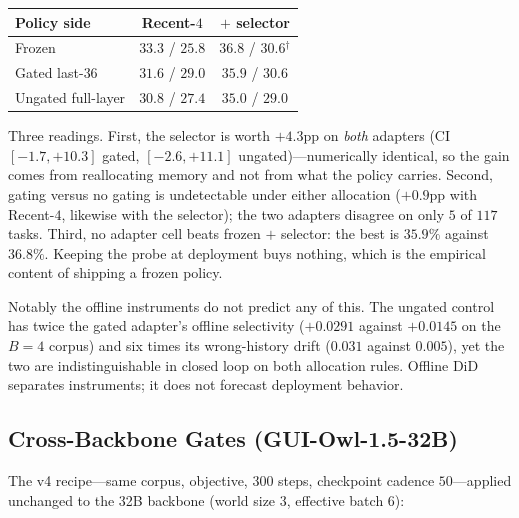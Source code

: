 \documentclass[letterpaper]{article} %
\begin{document}
\begin{center}
{\small
\setlength{\tabcolsep}{4.2pt}
\begin{tabular}{@{}lcc@{}}
\toprule
Policy side & Recent-$4$ & $+$ selector \\
\midrule
Frozen & $33.3$ / $25.8$ & $36.8$ / $30.6$$^{\dagger}$ \\
Gated last-$36$ & $31.6$ / $29.0$ & $35.9$ / $30.6$ \\
Ungated full-layer & $30.8$ / $27.4$ & $35.0$ / $29.0$ \\
\bottomrule
\end{tabular}
}
\label{tab:s-adapter-2x2}
\end{center}

Three readings. First, the selector is worth $+4.3$pp on \emph{both}
adapters (CI $[-1.7,+10.3]$ gated, $[-2.6,+11.1]$ ungated)---numerically
identical, so the gain comes from reallocating memory and not from what
the policy carries. Second, gating versus no gating is undetectable
under either allocation ($+0.9$pp with Recent-$4$, likewise with the
selector); the two adapters disagree on only $5$ of $117$ tasks. Third,
no adapter cell beats frozen $+$ selector: the best is $35.9\%$ against
$36.8\%$. Keeping the probe at deployment buys nothing, which is the
empirical content of shipping a frozen policy.

Notably the offline instruments do not predict any of this. The ungated
control has twice the gated adapter's offline selectivity ($+0.0291$
against $+0.0145$ on the $B{=}4$ corpus) and six times its
wrong-history drift ($0.031$ against $0.005$), yet the two are
indistinguishable in closed loop on both allocation rules. Offline DiD
separates instruments; it does not forecast deployment behavior.

\subsection{Cross-Backbone Gates (GUI-Owl-1.5-32B)}

The v4 recipe---same corpus, objective, $300$ steps, checkpoint cadence
$50$---applied unchanged to the 32B backbone (world size $3$, effective
batch $6$):
\end{document}

